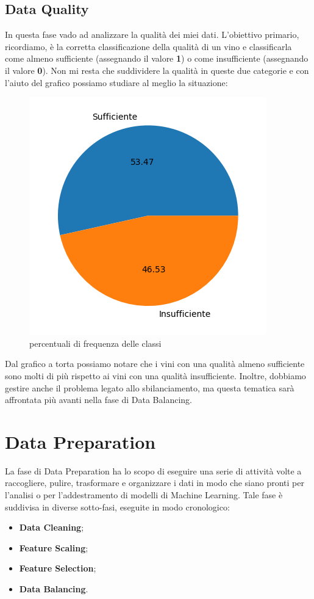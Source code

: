 \documentclass{article}
\begin{document}
\begin{titlepage}
        \newpage
        \subsection{Data Quality}
        In questa fase vado ad analizzare la qualità dei miei dati.
        L'obiettivo primario, ricordiamo, è la corretta classificazione della qualità di un vino e classificarla come almeno sufficiente (assegnando il valore \textbf{1}) o come insufficiente (assegnando il valore \textbf{0}). Non mi resta che suddividere la qualità in queste due categorie e con l'aiuto del grafico possiamo studiare al meglio la situazione:

        \begin{figure}[ht]
            \centering
            \includegraphics[width=0.5\linewidth]{pie-quality.png}
            \caption{  percentuali di frequenza delle classi}
            \label{fig:enter-label}
        \end{figure}

        Dal grafico a torta possiamo notare che i vini con una qualità almeno sufficiente sono molti di più rispetto ai vini con una qualità insufficiente.        
        Inoltre, dobbiamo gestire anche il problema legato allo sbilanciamento, ma questa tematica sarà affrontata più avanti nella fase di Data Balancing.
        \newpage
        \section{Data Preparation}
        La fase di Data Preparation ha lo scopo di eseguire una serie di attività volte a raccogliere, pulire, trasformare e organizzare i dati in modo che siano pronti per l'analisi o per l'addestramento di modelli di Machine Learning.
        Tale fase è suddivisa in diverse sotto-fasi, eseguite in modo cronologico:
        \begin{itemize}
            \item \textbf{Data Cleaning};
            \item \textbf{Feature Scaling};
            \item \textbf{Feature Selection};
            \item \textbf{Data Balancing}.
        \end{itemize}


\end{titlepage}
\end{document}
